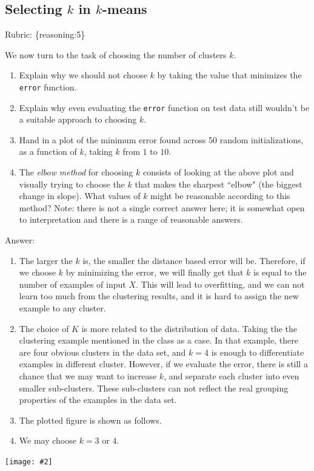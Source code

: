 \documentclass{article}
\def\rubric#1{\gre{Rubric: \{#1\}}}{}
\def\blu#1{{\color{blu}#1}}
\def\gre#1{{\color{gre}#1}}
\newcommand{\centerfig}[2]{\begin{center}\texttt{[image: \#2]}\end{center}}
\def\enum#1{\begin{enumerate}#1\end{enumerate}}
\begin{document}
 \subsection{Selecting $k$ in $k$-means}
\rubric{reasoning:5}

 We now turn to the task of choosing the number of clusters $k$.

 \blu{\enum{
 \item Explain why we should not choose $k$ by taking the value that minimizes the \texttt{error} function.
 \item Explain why even evaluating the \texttt{error} function on test data still wouldn't be a suitable approach to choosing $k$.
 \item Hand in a plot of the minimum error found across 50 random initializations, as a function of $k$, taking $k$ from $1$ to $10$.
 \item The \emph{elbow method} for choosing $k$ consists of looking at the above plot and visually trying to choose the $k$ that makes the sharpest ``elbow" (the biggest change in slope). What values of $k$ might be reasonable according to this method? Note: there is not a single correct answer here; it is somewhat open to interpretation and there is a range of reasonable answers.
 }}
\gre{Answer:
\begin{enumerate}
    \item The larger the $k$ is, the smaller the distance based error will be. Therefore, if we choose $k$ by minimizing the error, we will finally get that $k$ is equal to the number of examples of input $X$. This will lead to overfitting, and we can not learn too much from the clustering results, and it is hard to assign the new example to any cluster.
    \item The choice of $K$ is more related to the distribution of data.
    Taking the the clustering example mentioned in the class as a case. In that example, there are four obvious clusters in the data set, and $k=4$ is enough to differentiate examples in different cluster. However, if we evaluate the error, there is still a chance that we may want to increase $k$, and separate each cluster into even smaller sub-clusters. These sub-clusters can not reflect the real grouping properties of the examples in the data set.
    \item The plotted figure is shown as follows.
    \item We may choose $k=3$ or $4$.
\end{enumerate}
}
  \centerfig{.5}{../figs/error_with_k.png}
\end{document}
